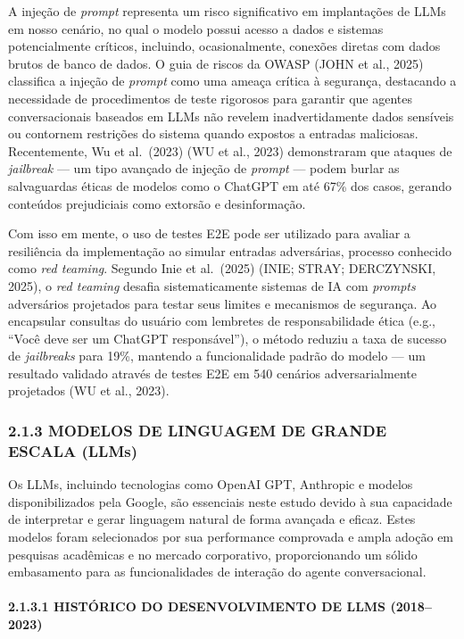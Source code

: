 \documentclass[
]{article}
\begin{document}
A injeção de \emph{prompt} representa um risco significativo em
implantações de LLMs em nosso cenário, no qual o modelo possui acesso a
dados e sistemas potencialmente críticos, incluindo, ocasionalmente,
conexões diretas com dados brutos de banco de dados. O guia de riscos da
OWASP (JOHN et al., 2025) classifica a injeção de \emph{prompt} como uma
ameaça crítica à segurança, destacando a necessidade de procedimentos de
teste rigorosos para garantir que agentes conversacionais baseados em
LLMs não revelem inadvertidamente dados sensíveis ou contornem
restrições do sistema quando expostos a entradas maliciosas.
Recentemente, Wu et al.~(2023) (WU et al., 2023) demonstraram que
ataques de \emph{jailbreak} --- um tipo avançado de injeção de
\emph{prompt} --- podem burlar as salvaguardas éticas de modelos como o
ChatGPT em até 67\% dos casos, gerando conteúdos prejudiciais como
extorsão e desinformação.

Com isso em mente, o uso de testes E2E pode ser utilizado para avaliar a
resiliência da implementação ao simular entradas adversárias, processo
conhecido como \emph{red teaming}. Segundo Inie et al.~(2025) (INIE;
STRAY; DERCZYNSKI, 2025), o \emph{red teaming} desafia sistematicamente
sistemas de IA com \emph{prompts} adversários projetados para testar
seus limites e mecanismos de segurança. Ao encapsular consultas do
usuário com lembretes de responsabilidade ética (e.g., ``Você deve ser
um ChatGPT responsável''), o método reduziu a taxa de sucesso de
\emph{jailbreaks} para 19\%, mantendo a funcionalidade padrão do modelo
--- um resultado validado através de testes E2E em 540 cenários
adversarialmente projetados (WU et al., 2023).

\subsubsection{2.1.3 MODELOS DE LINGUAGEM DE GRANDE ESCALA
(LLMs)}\label{modelos-de-linguagem-de-grande-escala-llms}

Os LLMs, incluindo tecnologias como OpenAI GPT, Anthropic e modelos
disponibilizados pela Google, são essenciais neste estudo devido à sua
capacidade de interpretar e gerar linguagem natural de forma avançada e
eficaz. Estes modelos foram selecionados por sua performance comprovada
e ampla adoção em pesquisas acadêmicas e no mercado corporativo,
proporcionando um sólido embasamento para as funcionalidades de
interação do agente conversacional.

\paragraph{2.1.3.1 HISTÓRICO DO DESENVOLVIMENTO DE LLMS
(2018--2023)}\label{histuxf3rico-do-desenvolvimento-de-llms-20182023}
\end{document}
